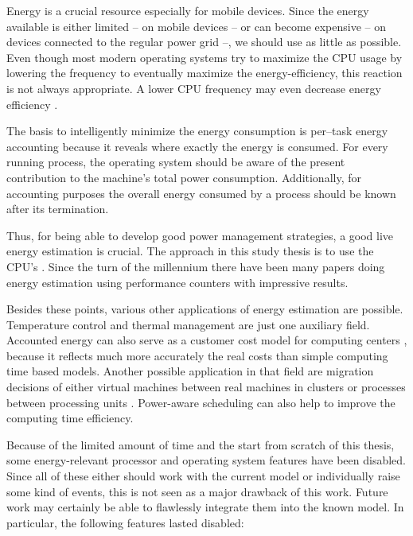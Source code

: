 
Energy is a crucial resource especially for mobile devices. Since the energy
available is either limited -- on mobile devices -- or can become expensive --
on devices connected to the regular power grid --, we should use as little as
possible. Even though most modern operating systems try to maximize the CPU
usage by lowering the frequency \cite{snowdon2010operating} to eventually
maximize the energy-efficiency, this reaction is not always appropriate. A lower
CPU frequency may even decrease energy efficiency
\cite{weissel2002process,snowdon2010operating}.

The basis to intelligently minimize the energy consumption is per--task energy
accounting because it reveals where exactly the energy is consumed.
For every running process, the operating system should be aware of the present
contribution to the machine's total power consumption. Additionally, for
accounting purposes the overall energy consumed by a process should be known
after its termination.

Thus, for being able to develop good power management strategies, a good live
energy estimation is crucial. The approach in this study thesis is to use the
CPU's . Since the turn of the millennium
\cite{bellosa2000benefits} there have been many papers
\cite{Bertran2010,bertran2010decomposable,kellner03tempcontrol,isci2003runtime,
weissel2002process} doing energy estimation using performance counters with
impressive results.

Besides these points, various other applications of energy estimation are
possible. Temperature control \cite{kellner03tempcontrol} and thermal management
\cite{merkel05tmsmpsys} are just one auxiliary field. Accounted energy can also
serve as a customer cost model for computing centers \cite{Bertran2010}, because
it reflects much more accurately the real costs than simple computing time
based models. Another possible application in that field are migration decisions
of either virtual machines between real machines in clusters or processes
between processing units \cite{merkel10rcscheduling}. Power-aware scheduling can
also help to improve the computing time efficiency.


\label{sec:restrictions}

Because of the limited amount of time and the start from scratch of this thesis,
some energy-relevant processor and operating system features have been disabled.
Since all of these either should work with the current model or individually
raise some kind of events, this is not seen as a major drawback of this work.
Future work may certainly be able to flawlessly integrate them into the known
model. In particular, the following features lasted disabled:

